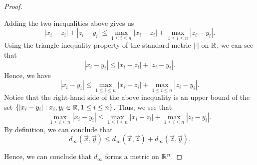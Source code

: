\documentclass[a4paper]{article}
\begin{document}
\begin{proof}
\begin{enumerate}
        Adding the two inequalities above gives us 
        \[  | {x}_{i} - {z}_{i} |  + | {z}_{i} - {y}_{i} |  \leq \max_{1 \leq   i \leq n} | {x}_{i} - {z}_{i} |  + \max_{1 \leq i \leq n} | {z}_{i} - {y}_{i} |.  \tag{\( 1 \leq i \leq n \)} \]
        Using the triangle inequality property of the standard metric \( | \cdot |  \) on \( \mathbb{R}  \), we can see that 
        \[  | {x}_{i} - {y}_{i} |  \leq | {x}_{i} - {z}_{i} |  + | {z}_{i} - {y}_{i} |. \]
        Hence, we have 
        \[  | {x}_{i} - {y}_{i} |  \leq  \max_{1 \leq   i \leq n} | {x}_{i} - {z}_{i} |  + \max_{1 \leq i \leq n} | {z}_{i} - {y}_{i} |. \]
        Notice that the right-hand side of the above inequality is an upper bound of the set \( \{ | {x}_{i} - {y}_{i} | : {x}_{i}, {y}_{i} \in \mathbb{R} , 1 \leq i \leq n \}  \). Thus, we see that 
        \[  \max_{1 \leq i \leq n } | {x}_{i} - {y}_{i} | \leq \max_{1 \leq   i \leq n} | {x}_{i} - {z}_{i} |  + \max_{1 \leq i \leq n} | {z}_{i} - {y}_{i} |. \]
        By definition, we can conclude that
        \[ {d}_{\infty }(\vec{ x } , \vec{ y } ) \leq {d}_{\infty }(\vec{ x } , \vec{ z } ) + {d}_{\infty }(\vec{ z } , \vec{ y } ).  \]
\end{enumerate}
Hence, we can conclude that \( {d}_{\infty } \) forms a metric on \( \mathbb{R}^{n} \).
\end{proof}
\end{document}
